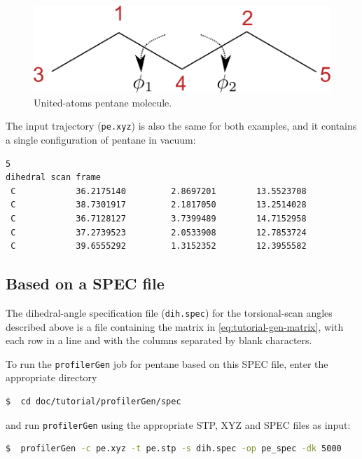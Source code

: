 \documentclass[10pt,a4paper,openany]{memoir}
\numberwithin{equation}{section}
\newcommand{\profilergen}[0]{\texttt{profilerGen}}
\begin{document}
\begin{figure}[tb]
  \centering
  \includegraphics[width=.3\textwidth]{pentane}
  \caption{United-atoms pentane molecule.}
  \label{fig:pentane}
\end{figure}

The input trajectory (\texttt{pe.xyz}) is also the same for both
examples, and it contains a single configuration of pentane in vacuum:

\begin{lstlisting}[language=gromacs]
5
dihedral scan frame
 C            36.2175140         2.8697201        13.5523708
 C            38.7301917         2.1817050        13.2514028
 C            36.7128127         3.7399489        14.7152958
 C            37.2739523         2.0533908        12.7853724
 C            39.6555292         1.3152352        12.3955582
\end{lstlisting}\vspace{2ex}\par

\noindent

\subsection{Based on a SPEC file}
\label{sec:tutorial-profilergen-spec}

The dihedral-angle specification file (\texttt{dih.spec}) for the
torsional-scan angles described above is a file containing the matrix
in \autoref{eq:tutorial-gen-matrix}, with each row in a line and with
the columns separated by blank characters.

To run the \profilergen{} job for pentane based on this SPEC file,
enter the appropriate directory

\begin{lstlisting}[language=bash]
$  cd doc/tutorial/profilerGen/spec
\end{lstlisting}\vspace{2ex}\par

\noindent
and run \profilergen{} using the appropriate STP, XYZ and SPEC files as input:

\begin{lstlisting}[language=bash]
$  profilerGen -c pe.xyz -t pe.stp -s dih.spec -op pe_spec -dk 5000
\end{lstlisting}\vspace{2ex}\par
\end{document}
